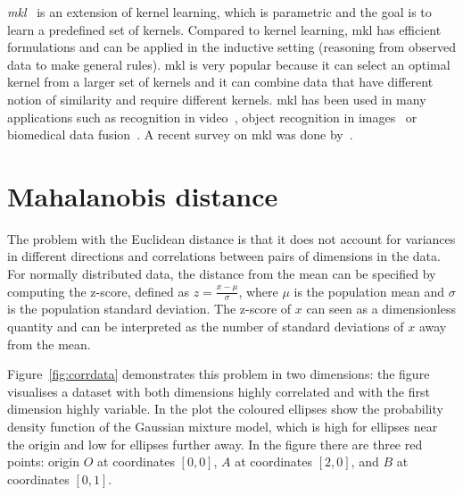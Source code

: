 \documentclass[12pt,a4paper]{report}
\begin{document}
\textit{\Ac{mkl}}~\citep{gonen2011multiple} is an extension of kernel learning, which is parametric and the goal is to learn a predefined set of kernels. Compared to kernel learning, \ac{mkl} has efficient formulations and can be applied in the inductive setting (reasoning from observed data to make general rules). \Ac{mkl} is very popular because it can select an optimal kernel from a larger set of kernels and it can combine data that have different notion of similarity and require different kernels. \ac{mkl} has been used in many applications such as recognition in video~\citep{chen2013event}, object recognition in images~\citep{bucak2014multiple} or biomedical data fusion~\citep{yu20102}. A recent survey on \ac{mkl} was done by~\citep{gonen2011multiple}.


\section{Mahalanobis distance} \label{chap:intro:mah}

The problem with the Euclidean distance is that it does not account for variances in different directions and correlations between pairs of dimensions in the data. For normally distributed data, the distance from the mean can be specified by computing the z-score, defined as $z = \frac{x-\mu}{\sigma}$, where $\mu$ is the population mean and $\sigma$ is the population standard deviation. The z-score of $x$ can seen as a dimensionless quantity and can be interpreted as the number of standard deviations of $x$ away from the mean.

Figure~\ref{fig:corrdata} demonstrates this problem in two dimensions: the figure visualises a dataset with both dimensions highly correlated and with the first dimension highly variable. In the plot the coloured ellipses show the probability density function of the Gaussian mixture model, which is high for ellipses near the origin and low for ellipses further away. In the figure there are three red points: 
origin $O$ at coordinates $[0,0]$,
$A$ at coordinates $[2,0]$,
and $B$ at coordinates $[0,1]$.

\end{document}
